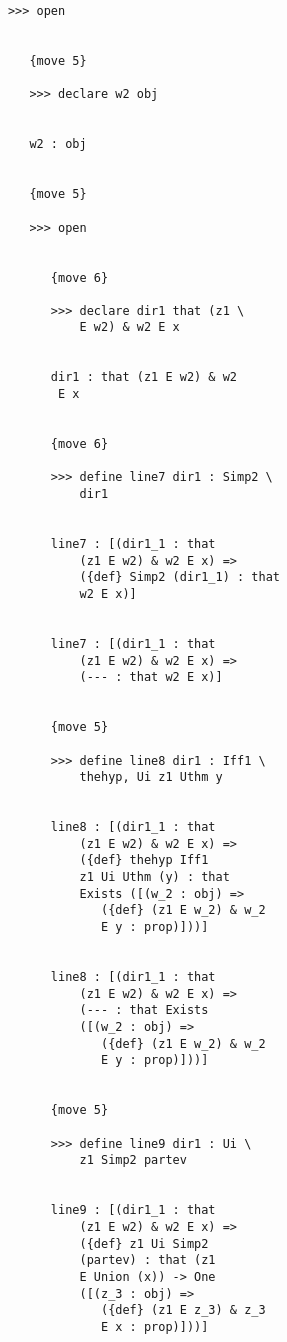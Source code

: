 \documentclass[12pt]{article}
\begin{document}
\begin{verbatim}
            >>> open


               {move 5}

               >>> declare w2 obj


               w2 : obj


               {move 5}

               >>> open


                  {move 6}

                  >>> declare dir1 that (z1 \
                      E w2) & w2 E x


                  dir1 : that (z1 E w2) & w2 
                   E x


                  {move 6}

                  >>> define line7 dir1 : Simp2 \
                      dir1


                  line7 : [(dir1_1 : that 
                      (z1 E w2) & w2 E x) => 
                      ({def} Simp2 (dir1_1) : that 
                      w2 E x)]


                  line7 : [(dir1_1 : that 
                      (z1 E w2) & w2 E x) => 
                      (--- : that w2 E x)]


                  {move 5}

                  >>> define line8 dir1 : Iff1 \
                      thehyp, Ui z1 Uthm y


                  line8 : [(dir1_1 : that 
                      (z1 E w2) & w2 E x) => 
                      ({def} thehyp Iff1 
                      z1 Ui Uthm (y) : that 
                      Exists ([(w_2 : obj) => 
                         ({def} (z1 E w_2) & w_2 
                         E y : prop)]))]


                  line8 : [(dir1_1 : that 
                      (z1 E w2) & w2 E x) => 
                      (--- : that Exists 
                      ([(w_2 : obj) => 
                         ({def} (z1 E w_2) & w_2 
                         E y : prop)]))]


                  {move 5}

                  >>> define line9 dir1 : Ui \
                      z1 Simp2 partev


                  line9 : [(dir1_1 : that 
                      (z1 E w2) & w2 E x) => 
                      ({def} z1 Ui Simp2 
                      (partev) : that (z1 
                      E Union (x)) -> One 
                      ([(z_3 : obj) => 
                         ({def} (z1 E z_3) & z_3 
                         E x : prop)]))]



\end{verbatim}
\end{document}
